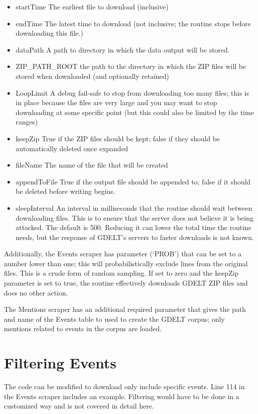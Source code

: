 \begin{itemize}
\item startTime The earliest file to download (inclusive)
\item endTime The latest time to download (not inclusive; the routine stops before downloading this file.)
\item dataPath A path to directory in which the data output will be stored.
\item ZIP\_PATH\_ROOT the path to the directory in which the ZIP files will be stored when downloaded (and optionally retained)
\item LoopLimit A debug fail-safe to stop from downloading too many files; this is in place because the files are very large and you may want to stop downloading at some specific point (but this could also be limited by the time ranges)
\item keepZip True if the ZIP files should be kept; false if they should be automatically deleted once expanded
\item fileName The name of the file that will be created
\item appendToFile True if the output file should be appended to; false if it should be deleted before writing begins.
\item sleepInterval An interval in milliseconds that the routine should wait between downloading files. This is to ensure that the server does not believe it is being attacked. The default is 500. Reducing it can lower the total time the routine needs, but the response of GDELT's servers to faster downloads is not known.
\end{itemize}

Additionally, the Events scraper has  parameter (`PROB') that can be set to a number lower than one; this will probabilistically exclude lines from the original files. This is a crude form of random sampling. If set to zero and the keepZip parameter is set to true, the routine effectively downloads GDELT ZIP files and does no other action.

The Mentions scraper has an additional required parameter that gives the path and name of the Events table to used to create the GDELT corpus; only mentions related to events in the corpus are loaded.

\section{Filtering Events}
The code can be modified to download only include specific events. Line 114 in the Events scraper includes an example. Filtering would have to be done in a customized way and is not covered in detail here.